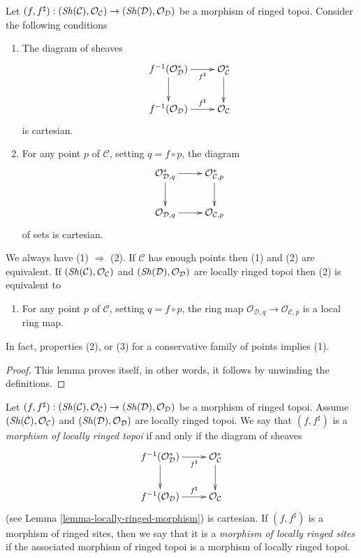 \begin{lemma}
\label{lemma-locally-ringed-morphism}
Let
$(f, f^\sharp) : (\mathop{\mathit{Sh}}\nolimits(\mathcal{C}), \mathcal{O}_\mathcal{C})
\to (\mathop{\mathit{Sh}}\nolimits(\mathcal{D}), \mathcal{O}_\mathcal{D})$
be a morphism of ringed topoi.
Consider the following conditions
\begin{enumerate}
\item The diagram of sheaves
$$
\xymatrix{
f^{-1}(\mathcal{O}^*_\mathcal{D}) \ar[r]_-{f^\sharp} \ar[d] &
\mathcal{O}^*_\mathcal{C} \ar[d] \\
f^{-1}(\mathcal{O}_\mathcal{D}) \ar[r]^-{f^\sharp} &
\mathcal{O}_\mathcal{C}
}
$$
is cartesian.
\item For any point $p$ of $\mathcal{C}$, setting $q = f \circ p$,
the diagram
$$
\xymatrix{
\mathcal{O}^*_{\mathcal{D}, q} \ar[r] \ar[d] &
\mathcal{O}^*_{\mathcal{C}, p} \ar[d] \\
\mathcal{O}_{\mathcal{D}, q} \ar[r] &
\mathcal{O}_{\mathcal{C}, p}
}
$$
of sets is cartesian.
\end{enumerate}
We always have (1) $\Rightarrow$ (2). If $\mathcal{C}$ has enough points
then (1) and (2) are equivalent. If
$(\mathop{\mathit{Sh}}\nolimits(\mathcal{C}), \mathcal{O}_\mathcal{C})$
and
$(\mathop{\mathit{Sh}}\nolimits(\mathcal{D}), \mathcal{O}_\mathcal{D})$
are locally ringed topoi then (2) is equivalent to
\begin{enumerate}
\item[(3)] For any point $p$ of $\mathcal{C}$, setting $q = f \circ p$,
the ring map $\mathcal{O}_{\mathcal{D}, q} \to \mathcal{O}_{\mathcal{C}, p}$
is a local ring map.
\end{enumerate}
In fact, properties (2), or (3) for a conservative
family of points implies (1).
\end{lemma}

\begin{proof}
This lemma proves itself, in other words, it follows by unwinding the
definitions.
\end{proof}

\begin{definition}
\label{definition-morphism-locally-ringed-topoi}
Let $(f, f^\sharp) : (\mathop{\mathit{Sh}}\nolimits(\mathcal{C}), \mathcal{O}_\mathcal{C})
\to (\mathop{\mathit{Sh}}\nolimits(\mathcal{D}), \mathcal{O}_\mathcal{D})$
be a morphism of ringed topoi. Assume
$(\mathop{\mathit{Sh}}\nolimits(\mathcal{C}), \mathcal{O}_\mathcal{C})$
and
$(\mathop{\mathit{Sh}}\nolimits(\mathcal{D}), \mathcal{O}_\mathcal{D})$
are locally ringed topoi. We say that $(f, f^\sharp)$ is a
{\it morphism of locally ringed topoi} if and only if the
diagram of sheaves
$$
\xymatrix{
f^{-1}(\mathcal{O}^*_\mathcal{D}) \ar[r]_-{f^\sharp} \ar[d] &
\mathcal{O}^*_\mathcal{C} \ar[d] \\
f^{-1}(\mathcal{O}_\mathcal{D}) \ar[r]^-{f^\sharp} &
\mathcal{O}_\mathcal{C}
}
$$
(see
Lemma \ref{lemma-locally-ringed-morphism})
is cartesian. If $(f, f^\sharp)$ is a morphism of ringed sites, then
we say that it is a {\it morphism of locally ringed sites} if
the associated morphism of ringed topoi is a morphism of locally ringed
topoi.
\end{definition}

